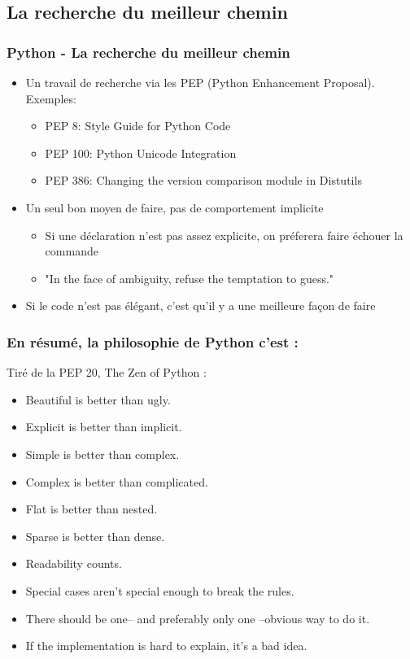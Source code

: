 \subsection{La recherche du meilleur chemin}
\begin{frame}
\frametitle{Python - La recherche du meilleur chemin}
  \begin{itemize}
    \item Un travail de recherche via les PEP (Python Enhancement Proposal). Exemples:
    \begin{itemize}
      \item PEP 8: Style Guide for Python Code
      \item PEP 100: Python Unicode Integration
      \item PEP 386: Changing the version comparison module in Distutils
    \end{itemize}
    \pause
    \item Un seul bon moyen de faire, pas de comportement implicite
    \begin{itemize}
      \item Si une déclaration n'est pas assez explicite, on préferera faire échouer la commande
      \item "In the face of ambiguity, refuse the temptation to guess."
    \end{itemize}
    \pause
    \item Si le code n'est pas élégant, c'est qu'il y a une meilleure façon de faire
  \end{itemize}
\end{frame}

\begin{frame}[fragile]
\frametitle{En résumé, la philosophie de Python c'est :}
Tiré de la PEP 20, The Zen of Python :
  \begin{itemize}
    \item Beautiful is better than ugly.
    \item Explicit is better than implicit.
    \item Simple is better than complex.
    \item Complex is better than complicated.
    \item Flat is better than nested.
    \item Sparse is better than dense.
    \item Readability counts.
    \item Special cases aren't special enough to break the rules.
    \item There should be one-- and preferably only one --obvious way to do it.
    \item If the implementation is hard to explain, it's a bad idea.
  \end{itemize}
\end{frame}
\newpage
